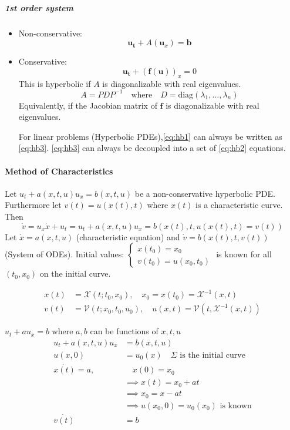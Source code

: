 \subparagraph{1st order system}
\begin{itemize}
  \item Non-conservative: 
  \[
  \label{eq:hb3}
  \symbf{u_t} + A(\symbf{u}_x) = \symbf{b}\tag{3}
  \]
  \item Conservative: \[\symbf{u_t} + (\symbf{f}(\symbf{u}))_x = 0\]
        This is hyperbolic if \(A\) is diagonalizable with real eigenvalues.
        \[
          A = PDP^{-1} \quad \text{where} \quad D = \text{diag}(\lambda_1, \ldots, \lambda_n)
        \]
        Equivalently, if the Jacobian matrix of \(\symbf{f}\) is diagonalizable with real eigenvalues.

        For linear problems (Hyperbolic PDEs),\eqref{eq:hb1} can always be written as \eqref{eq:hb3}.
        \eqref{eq:hb3} can always be decoupled into a set of \eqref{eq:hb2} equations.
\end{itemize}
\paragraph{Method of Characteristics}
Let \(u_t + a(x,t,u)u_x = b(x,t,u)\) be a non-conservative hyperbolic PDE. Furthermore let \(v(t) = u(x(t), t)\) where \(x(t)\) is a characteristic curve. Then
\[
  \dot{v} = u_x \dot{x} + u_t = u_t + a(x,t,u)u_x = b(x(t), t, u(x(t), t)=v(t))
\]
Let \(\dot{x} = a(x,t,u)\) (characteristic equation) and \(\dot{v} = b(x(t), t, v(t))\) (System of ODEs).
Initial values: \(\begin{cases} x(t_0) = x_0 \\ v(t_0) = u(x_0, t_0) \end{cases}\) is known for all \((t_0, x_0)\) on the initial curve.

\begin{align*}
  x(t) & = \mathcal{X}(t; t_0, x_0), \quad x_0 = x(t_0) = \mathcal{X}^{-1}(x, t)               \\
  v(t) & = \mathcal{V}(t; x_0, t_0, u_0), \quad u(x,t) = \mathcal{V}(t, \mathcal{X}^{-1}(x,t))
\end{align*}

\begin{example}{}{}
  \(u_t + a u_x = b\) where \(a, b\) can be functions of \(x, t, u\)
  \begin{align*}
    u_t + a(x,t,u)u_x      & = b(x,t,u)                                           \\
    u(x,0)                 & = u_0(x)   \quad \Sigma \text{ is the initial curve} \\
    \dot{x(t)}        = a, & \quad x(0) = x_0                                     \\
                           & \implies x(t) = x_0 + at                             \\
                           & \implies x_0 = x - at                                \\
                           & \implies u(x_0, 0) = u_0(x_0) \text{ is known}       \\
    \dot{v(t)}             & = b
  \end{align*}


\end{example}


